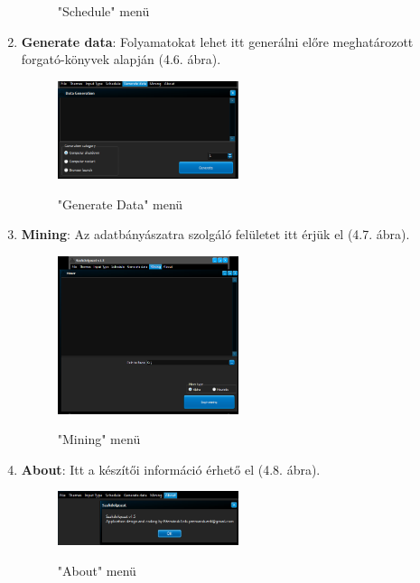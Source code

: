 \begin{enumerate}
{\begin{figure}[h!]
\begin{center}
				\caption{"Schedule" menü}
				\label{fig:example}
			\end{center}
		\end{figure}
	}
	\item{
		\textbf{Generate data}: Folyamatokat lehet itt generálni előre meghatározott forgató\hyp{}könyvek alapján (4.6. ábra).
		\begin{figure}[h!]
			\begin{center}
				\includegraphics[width=0.5\textwidth, keepaspectratio=true]{images/img_ui_datagen}\\
				\caption{"Generate Data" menü}
				\label{fig:example}
			\end{center}
		\end{figure}
	}
	\item{
		\textbf{Mining}: Az adatbányászatra szolgáló felületet itt érjük el (4.7. ábra).
		\begin{figure}[h!]
			\begin{center}
				\includegraphics[width=0.5\textwidth, keepaspectratio=true]{images/img_ui_mining}\\
				\caption{"Mining" menü}
				\label{fig:example}
			\end{center}
		\end{figure}
	}
	\item{
		\textbf{About}: Itt a készítői információ érhető el (4.8. ábra).
		\begin{figure}[h!]
			\begin{center}
				\includegraphics[width=0.5\textwidth, keepaspectratio=true]{images/img_ui_about}\\
				\caption{"About" menü}
				\label{fig:example}
			\end{center}
		\end{figure}
	}
\end{enumerate}

